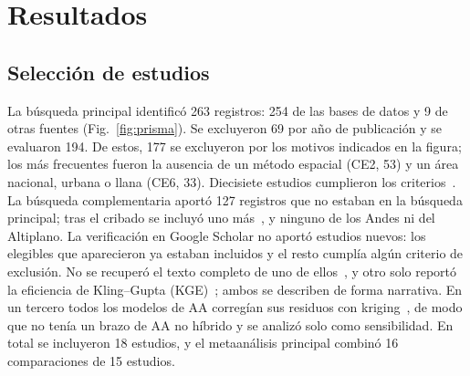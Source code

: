 \documentclass[conference]{IEEEtran}
\begin{document}
\section{Resultados}

\subsection{Selección de estudios}
La búsqueda principal identificó 263 registros: 254 de las bases de datos y 9 de otras fuentes (Fig.~\ref{fig:prisma}). Se excluyeron 69 por año de publicación y se evaluaron 194. De estos, 177 se excluyeron por los motivos indicados en la figura; los más frecuentes fueron la ausencia de un método espacial (CE2, 53) y un área nacional, urbana o llana (CE6, 33). Diecisiete estudios cumplieron los criterios~\cite{sekulic2020,chen2021,ghorbanpour2021,orellana2021,zhang2022,lu2023,zhu2023,achite2024,dura2024,arganaraz2025,ghorbani2025,he2025,husrevoglu2025,liu2025,ahmed2026,jiang2026,liu2026}. La búsqueda complementaria aportó 127 registros que no estaban en la búsqueda principal; tras el cribado se incluyó uno más~\cite{li2026}, y ninguno de los Andes ni del Altiplano. La verificación en Google Scholar no aportó estudios nuevos: los elegibles que aparecieron ya estaban incluidos y el resto cumplía algún criterio de exclusión. No se recuperó el texto completo de uno de ellos~\cite{ahmed2026}, y otro solo reportó la eficiencia de Kling--Gupta (KGE)~\cite{dura2024}; ambos se describen de forma narrativa. En un tercero todos los modelos de AA corregían sus residuos con kriging~\cite{zhang2022}, de modo que no tenía un brazo de AA no híbrido y se analizó solo como sensibilidad. En total se incluyeron 18 estudios, y el metaanálisis principal combinó 16 comparaciones de 15 estudios.
\end{document}
